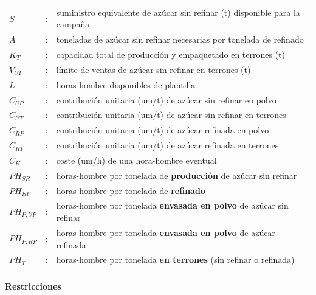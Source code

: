 \begin{tabular}{l c l}
    $S$      & : & suministro equivalente de azúcar sin refinar (t) disponible para la campaña \\
    $A$      & : & toneladas de azúcar sin refinar necesarias por tonelada de refinado \\
    $K_T$    & : & capacidad total de producción y empaquetado en terrones (t) \\
    $V_{UT}$ & : & límite de ventas de azúcar sin refinar en terrones (t) \\
    $L$      & : & horas-hombre disponibles de plantilla \\
    $C_{UP}$ & : & contribución unitaria (um/t) de azúcar sin refinar en polvo \\
    $C_{UT}$ & : & contribución unitaria (um/t) de azúcar sin refinar en terrones \\
    $C_{RP}$ & : & contribución unitaria (um/t) de azúcar refinada en polvo \\
    $C_{RT}$ & : & contribución unitaria (um/t) de azúcar refinada en terrones \\
    $C_H$    & : & coste (um/h) de una hora-hombre eventual \\
    $PH_{SR}$& : & horas-hombre por tonelada de \textbf{producción} de azúcar sin refinar \\
    $PH_{RF}$& : & horas-hombre por tonelada de \textbf{refinado} \\
    $PH_{P,UP}$ & : & horas-hombre por tonelada \textbf{envasada en polvo} de azúcar sin refinar \\
    $PH_{P,RP}$ & : & horas-hombre por tonelada \textbf{envasada en polvo} de azúcar refinada \\
    $PH_T$   & : & horas-hombre por tonelada \textbf{en terrones} (sin refinar o refinada) \\
\end{tabular}



\paragraph{Restricciones}\mbox{}\\

